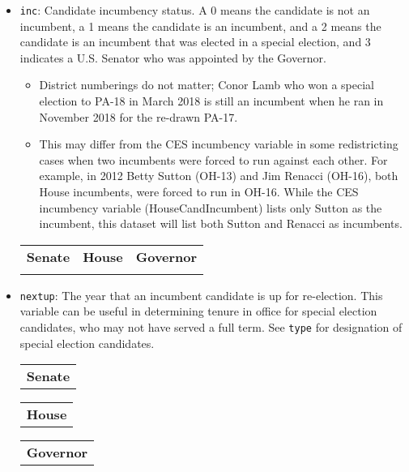 \documentclass[12pt]{article}
\begin{document}
\begin{itemize}[leftmargin=*]
\item \texttt{inc}: Candidate incumbency status. A 0 means the candidate is not an incumbent, a 1 means the candidate is an incumbent, and a 2 means the candidate is an incumbent that was elected in a special election, and 3 indicates a U.S. Senator who was appointed by the Governor.
\begin{itemize}
\item District numberings do not matter; Conor Lamb who won a special election to PA-18 in March 2018 is still an incumbent when he ran in November 2018 for the re-drawn PA-17.
\item This may differ from the CES incumbency variable in some redistricting cases when two incumbents were forced to run against each other. For example, in 2012 Betty Sutton (OH-13) and Jim Renacci (OH-16), both House incumbents, were forced to run in OH-16. While the CES incumbency variable (HouseCandIncumbent) lists only Sutton as the incumbent, this dataset will list both Sutton and Renacci as incumbents. 
  
\end{itemize}

    \begin{tabularx}{\linewidth}{CCC}
    \textbf{Senate} & \textbf{House} & \textbf{Governor}\\
     &  & 
    \end{tabularx}

\item \texttt{nextup}: The year that an incumbent candidate is up for re-election. This variable can be useful in determining tenure in office for special election candidates, who may not have served a full term. See \texttt{type} for designation of special election candidates. 		

\begin{tabularx}{\linewidth}{C}
\textbf{Senate}\\

\end{tabularx}

\begin{tabularx}{\linewidth}{C}
\textbf{House}\\
 
\end{tabularx}

\begin{tabularx}{\linewidth}{C}
\textbf{Governor}\\

\end{tabularx}


\end{itemize}
\end{document}
